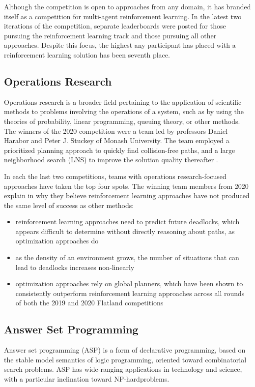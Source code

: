 \documentclass[11pt]{article}
\begin{document}
Although the competition is open to approaches from any domain, it has branded itself as a competition for multi-agent reinforcement learning.  In the latest two iterations of the competition, separate leaderboards were posted for those pursuing the reinforcement learning track and those pursuing all other approaches.  Despite this focus, the highest any participant has placed with a reinforcement learning solution has been seventh place.

\subsection{Operations Research}
Operations research \citep{gupta92a} is a broader field pertaining to the application of scientific methods to problems involving the operations of a system, such as by using the theories of probability, linear programming, queuing theory, or other methods.  The winners of the 2020 competition were a team led by professors Daniel Harabor and Peter J. Stuckey of Monash University.  The team employed a prioritized planning approach to quickly find collision-free paths, and a large neighborhood search (LNS) to improve the solution quality thereafter \citep{lichzhchhastmako21a}.

In each the last two competitions, teams with operations research-focused approaches have taken the top four spots.  The winning team members from 2020 explain in \citep{lichzhchhastmako21a} why they believe reinforcement learning approaches have not produced the same level of success as other methods:
\begin{itemize}
	\item reinforcement learning approaches need to predict future deadlocks, which appears difficult to determine without directly reasoning about paths, as optimization approaches do
	\item as the density of an environment grows, the number of situations that can lead to deadlocks increases non-linearly
	\item optimization approaches rely on global planners, which have been shown to consistently outperform reinforcement learning approaches across all rounds of both the 2019 and 2020 Flatland competitions
\end{itemize}


\subsection{Answer Set Programming}
Answer set programming (ASP) \citep{lifschitz19a} is a form of declarative programming, based on the stable model semantics of logic programming, oriented toward combinatorial search problems.  ASP has wide-ranging applications in technology and science, with a particular inclination toward NP-hard\footnotemark problems.
\end{document}
